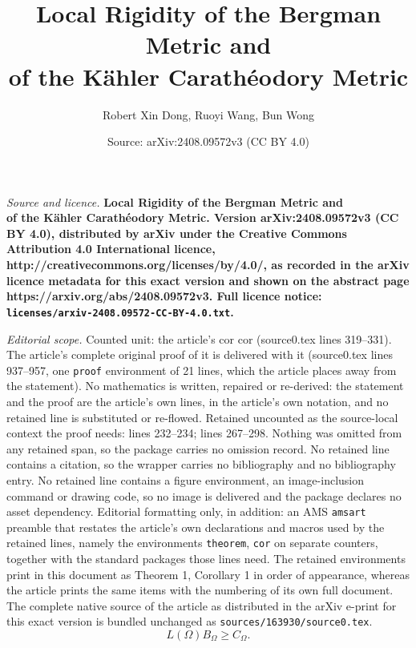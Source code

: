 \documentclass[10pt,a4paper]{amsart}
\title{\vspace{-1.2cm} \bf Local Rigidity of the Bergman Metric and\\ of the K\"ahler Carath\'eodory Metric}
\author{Robert Xin Dong, Ruoyi Wang, Bun Wong}
\date{Source: arXiv:2408.09572v3 (CC BY 4.0)}
\begin{document}
\maketitle

\noindent\emph{Source and licence.} \vspace{-1.2cm} \bf Local Rigidity of the Bergman Metric and\\ of the K\"ahler Carath\'eodory Metric. Version arXiv:2408.09572v3 (CC BY 4.0), distributed by arXiv under the Creative Commons Attribution 4.0 International licence, http://creativecommons.org/licenses/by/4.0/, as recorded in the arXiv licence metadata for this exact version and shown on the abstract page https://arxiv.org/abs/2408.09572v3. Full licence notice: \texttt{licenses/arxiv-2408.09572-CC-BY-4.0.txt}.\par\smallskip

\noindent\textit{Editorial scope.} Counted unit: the article's cor cor (source0.tex lines 319--331). The article's complete original proof of it is delivered with it (source0.tex lines 937--957, one \texttt{proof} environment of 21 lines, which the article places away from the statement). No mathematics is written, repaired or re-derived: the statement and the proof are the article's own lines, in the article's own notation, and no retained line is substituted or re-flowed.  Retained uncounted as the source-local context the proof needs: lines 232--234; lines 267--298.  Nothing was omitted from any retained span, so the package carries no omission record.  No retained line contains a citation, so the wrapper carries no bibliography and no bibliography entry.  No retained line contains a figure environment, an image-inclusion command or drawing code, so no image is delivered and the package declares no asset dependency.  Editorial formatting only, in addition: an AMS \texttt{amsart} preamble that restates the article's own declarations and macros used by the retained lines, namely the environments \texttt{theorem}, \texttt{cor} on separate counters, together with the standard packages those lines need.  The retained environments print in this document as Theorem 1, Corollary 1 in order of appearance, whereas the article prints the same items with the numbering of its own full document.  The complete native source of the article as distributed in the arXiv e-print for this exact version is bundled unchanged as \texttt{sources/163930/source0.tex}.
\begin{equation} \label{sharp}
L(\Omega) B_\Omega \geq C_\Omega.
\end{equation}
\end{document}
